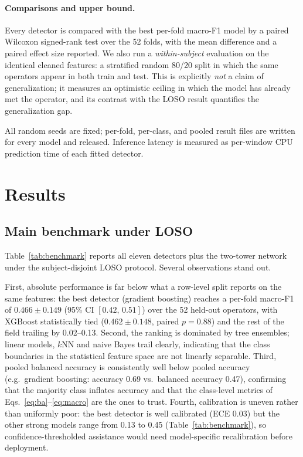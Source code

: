 \documentclass{llncs}
\begin{document}
\paragraph{Comparisons and upper bound.}
Every detector is compared with the best per-fold macro-F1 model by a paired
Wilcoxon signed-rank test over the 52 folds, with the mean difference and a paired
effect size reported. We also run a \emph{within-subject} evaluation on the identical
cleaned features: a stratified random 80/20 split in which the same operators appear
in both train and test. This is explicitly \emph{not} a claim of generalization; it
measures an optimistic ceiling in which the model has already met the operator, and
its contrast with the \ac{LOSO} result quantifies the generalization gap.

All random seeds are fixed; per-fold, per-class, and pooled result files are written
for every model and released. Inference latency is measured as per-window CPU
prediction time of each fitted detector.

\section{Results}
\label{sec:results}

\subsection{Main benchmark under \ac{LOSO}}

Table~\ref{tab:benchmark} reports all eleven detectors plus the two-tower network
under the subject-disjoint \ac{LOSO} protocol. Several observations stand out.



First, absolute performance is far below what a row-level split reports on the same
features: the best detector (gradient boosting) reaches a per-fold macro-F1 of
$0.466 \pm 0.149$ (95\% CI $[0.42,\,0.51]$) over the 52 held-out operators, with
\ac{XGBoost} statistically tied ($0.462 \pm 0.148$, paired $p = 0.88$) and the rest
of the field trailing by 0.02--0.13. Second, the ranking is dominated by tree
ensembles; linear models, $k$NN and naive Bayes trail clearly, indicating that the
class boundaries in the statistical feature space are not linearly separable. Third,
pooled balanced accuracy is consistently well below pooled accuracy (e.g.\ gradient
boosting: accuracy 0.69 vs.\ balanced accuracy 0.47), confirming that the majority
class inflates accuracy and that the class-level metrics of
Eqs.~\eqref{eq:ba}--\eqref{eq:macro} are the ones to trust. Fourth, calibration is
uneven rather than uniformly poor: the best detector is well calibrated
(\ac{ECE} $0.03$) but the other strong models range from 0.13 to 0.45
(Table~\ref{tab:benchmark}), so confidence-thresholded assistance would need
model-specific recalibration before deployment.
\end{document}
